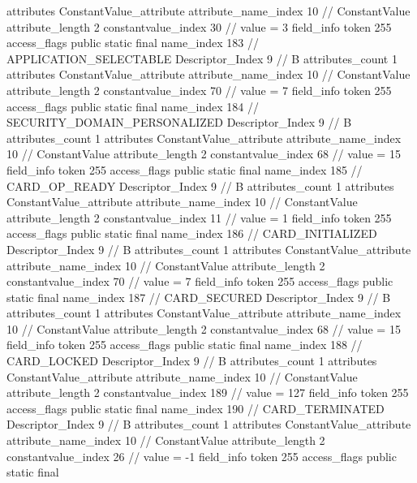 {{{{{				attributes {
				ConstantValue_attribute {
					attribute_name_index	10		// ConstantValue
					attribute_length	2
					constantvalue_index	30		// value = 3
				}
				}
			}
			field_info {
				token	255
				access_flags	public static final
				name_index	183		// APPLICATION_SELECTABLE
				Descriptor_Index	9		// B
				attributes_count	1
				attributes {
				ConstantValue_attribute {
					attribute_name_index	10		// ConstantValue
					attribute_length	2
					constantvalue_index	70		// value = 7
				}
				}
			}
			field_info {
				token	255
				access_flags	public static final
				name_index	184		// SECURITY_DOMAIN_PERSONALIZED
				Descriptor_Index	9		// B
				attributes_count	1
				attributes {
				ConstantValue_attribute {
					attribute_name_index	10		// ConstantValue
					attribute_length	2
					constantvalue_index	68		// value = 15
				}
				}
			}
			field_info {
				token	255
				access_flags	public static final
				name_index	185		// CARD_OP_READY
				Descriptor_Index	9		// B
				attributes_count	1
				attributes {
				ConstantValue_attribute {
					attribute_name_index	10		// ConstantValue
					attribute_length	2
					constantvalue_index	11		// value = 1
				}
				}
			}
			field_info {
				token	255
				access_flags	public static final
				name_index	186		// CARD_INITIALIZED
				Descriptor_Index	9		// B
				attributes_count	1
				attributes {
				ConstantValue_attribute {
					attribute_name_index	10		// ConstantValue
					attribute_length	2
					constantvalue_index	70		// value = 7
				}
				}
			}
			field_info {
				token	255
				access_flags	public static final
				name_index	187		// CARD_SECURED
				Descriptor_Index	9		// B
				attributes_count	1
				attributes {
				ConstantValue_attribute {
					attribute_name_index	10		// ConstantValue
					attribute_length	2
					constantvalue_index	68		// value = 15
				}
				}
			}
			field_info {
				token	255
				access_flags	public static final
				name_index	188		// CARD_LOCKED
				Descriptor_Index	9		// B
				attributes_count	1
				attributes {
				ConstantValue_attribute {
					attribute_name_index	10		// ConstantValue
					attribute_length	2
					constantvalue_index	189		// value = 127
				}
				}
			}
			field_info {
				token	255
				access_flags	public static final
				name_index	190		// CARD_TERMINATED
				Descriptor_Index	9		// B
				attributes_count	1
				attributes {
				ConstantValue_attribute {
					attribute_name_index	10		// ConstantValue
					attribute_length	2
					constantvalue_index	26		// value = -1
				}
				}
			}
			field_info {
				token	255
				access_flags	public static final
}}}}}

